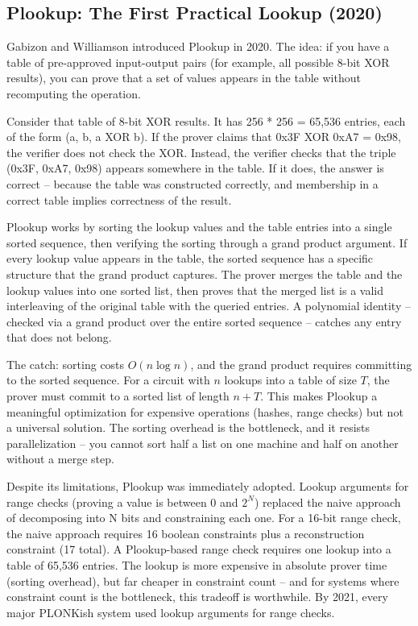 \documentclass[
  11pt,
  openany]{report}
\begin{document}
\subsection{Plookup: The First Practical Lookup
(2020)}\label{plookup-the-first-practical-lookup-2020}

Gabizon and Williamson introduced Plookup in 2020. The idea: if you have a table
of pre-approved input-output pairs (for example, all possible 8-bit XOR
results), you can prove that a set of values appears in the table without
recomputing the operation.

Consider that table of 8-bit XOR results. It has 256 * 256 = 65,536 entries,
each of the form (a, b, a XOR b). If the prover claims that 0x3F XOR 0xA7 =
0x98, the verifier does not check the XOR. Instead, the verifier checks that the
triple (0x3F, 0xA7, 0x98) appears somewhere in the table. If it does, the answer
is correct -- because the table was constructed correctly, and membership in a
correct table implies correctness of the result.

Plookup works by sorting the lookup values and the table entries into a single
sorted sequence, then verifying the sorting through a grand product argument. If
every lookup value appears in the table, the sorted sequence has a specific
structure that the grand product captures. The prover merges the table and the
lookup values into one sorted list, then proves that the merged list is a valid
interleaving of the original table with the queried entries. A polynomial
identity -- checked via a grand product over the entire sorted sequence --
catches any entry that does not belong.

The catch: sorting costs \(O(n \log n)\), and the grand product requires
committing to the sorted sequence. For a circuit with \(n\) lookups into a table
of size \(T\), the prover must commit to a sorted list of length \(n + T\). This
makes Plookup a meaningful optimization for expensive operations (hashes, range
checks) but not a universal solution. The sorting overhead is the bottleneck,
and it resists parallelization -- you cannot sort half a list on one machine and
half on another without a merge step.

Despite its limitations, Plookup was immediately adopted. Lookup arguments for
range checks (proving a value is between \(0\) and \(2^N\)) replaced the naive
approach of decomposing into N bits and constraining each one. For a 16-bit
range check, the naive approach requires 16 boolean constraints plus a
reconstruction constraint (17 total). A Plookup-based range check requires one
lookup into a table of 65,536 entries. The lookup is more expensive in absolute
prover time (sorting overhead), but far cheaper in constraint count -- and for
systems where constraint count is the bottleneck, this tradeoff is worthwhile.
By 2021, every major PLONKish system used lookup arguments for range checks.
\end{document}

